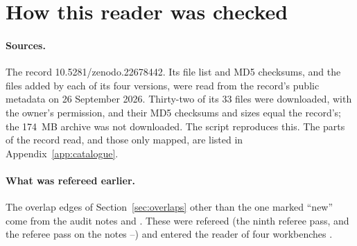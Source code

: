 \section{How this reader was checked}\label{app:verification}

\paragraph{Sources.}
The record 10.5281/zenodo.22678442. Its file list and MD5 checksums, and the files added by each of its four versions, were read from the record's public metadata on 26 September 2026. Thirty-two of its 33 files were downloaded, with the owner's permission, and their MD5 checksums and sizes equal the record's; the 174~MB archive  was not downloaded. The script  reproduces this. The parts of the record read, and those only mapped, are listed in Appendix~\ref{app:catalogue}.

\paragraph{What was refereed earlier.}
The overlap edges of Section~\ref{sec:overlaps} other than the one marked ``new'' come from the audit notes  and . These were refereed (the ninth referee pass, and the referee pass on the notes --) and entered the reader of four workbenches \cite{WorkbenchReader}.

